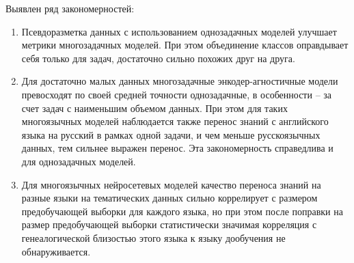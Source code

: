Выявлен ряд закономерностей:
\begin{enumerate}
  \item {Псевдоразметка данных с использованием однозадачных моделей улучшает метрики многозадачных моделей. При этом объединение классов оправдывает себя только для задач, достаточно сильно похожих друг на друга.}
  \item {Для достаточно малых данных многозадачные энкодер-агностичные модели превосходят по своей средней точности однозадачные, в особенности -- за счет задач с наименьшим объемом данных. При этом для таких многоязычных моделей наблюдается также перенос знаний с английского языка на русский в рамках одной задачи, и чем меньше русскоязычных данных, тем сильнее выражен перенос. Эта закономерность справедлива и для однозадачных моделей.}
  \item {Для многоязычных нейросетевых моделей качество переноса знаний на разные языки на тематических данных сильно коррелирует с размером предобучающей выборки для каждого языка, но при этом после поправки на размер предобучающей выборки статистически значимая корреляция с генеалогической близостью этого языка к языку дообучения не обнаруживается.}
\end{enumerate}

